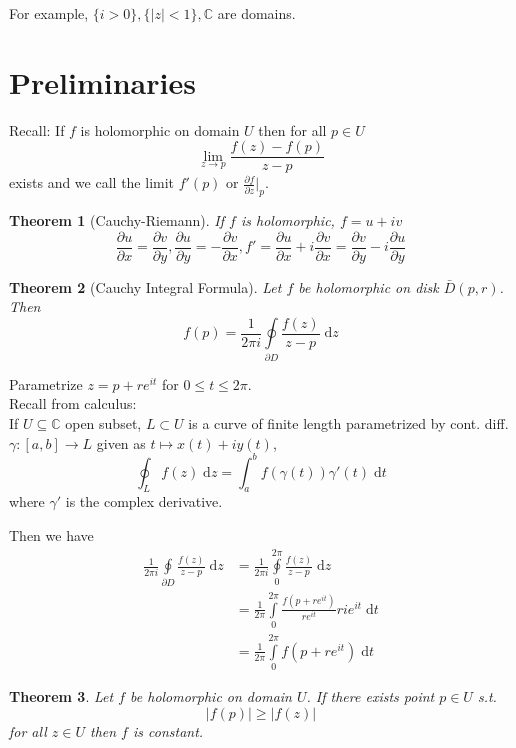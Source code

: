 \documentclass{article}
\newtheorem{theorem}{Theorem}
\begin{document}
For example, $\{i > 0\}, \{|z| < 1\}, \mathbb{C}$ are domains.


\section{Preliminaries}
Recall: If $f$ is holomorphic on domain $U$ then for all $p \in U$
$$\lim_{z \to p} \frac{f(z) - f(p)}{z - p}$$
exists and we call the limit $f'(p)$ or $\frac{\partial f}{\partial z} |_p$.

\begin{theorem}[Cauchy-Riemann]
If $f$ is holomorphic, $f = u + iv$
$$\frac{\partial u}{\partial x} = \frac{\partial v}{\partial y}, \frac{\partial u}{\partial y} = -\frac{\partial v}{\partial x}, f' = \frac{\partial u}{\partial x} + i \frac{\partial v}{\partial x} = \frac{\partial v}{\partial y} - i \frac{\partial u}{\partial y}$$
\end{theorem}

\begin{theorem}[Cauchy Integral Formula]
Let $f$ be holomorphic on disk $\bar{D}(p,r)$. Then
$$f(p) = \frac{1}{2\pi i} \oint\limits_{\partial D} \frac{f(z)}{z-p} \;\mathrm{d}z$$
\end{theorem}

Parametrize $z = p + re^{it}$ for $0 \leq t \leq 2\pi$.\\
Recall from calculus:\\
If $U \subseteq \mathbb{C}$ open subset, $L \subset U$ is a curve of finite length parametrized by cont. diff. $\gamma : [a,b] \to L$ given as $t \mapsto x(t) + iy(t)$,
$$\oint_L f(z) \;\mathrm{d}z = \int_a^b f(\gamma(t))\gamma'(t) \;\mathrm{d}t$$
where $\gamma'$ is the complex derivative.

Then we have
\begin{equation*}
\begin{split}
\frac{1}{2\pi i} \oint\limits_{\partial D} \frac{f(z)}{z-p} \;\mathrm{d}z &= \frac{1}{2\pi i} \oint\limits_0^{2\pi} \frac{f(z)}{z-p} \;\mathrm{d}z\\
&= \frac{1}{2\pi} \int\limits_0^{2\pi} \frac{f(p + re^{it})}{re^{it}} rie^{it} \;\mathrm{d}t\\
&= \frac{1}{2\pi} \int\limits_0^{2\pi} f(p + re^{it}) \;\mathrm{d}t
\end{split}
\end{equation*}

\begin{theorem}
Let $f$ be holomorphic on domain $U$. If there exists point $p \in U$ s.t.
$$|f(p)| \geq |f(z)|$$
for all $z \in U$ then $f$ is constant.
\end{theorem}
\end{document}
